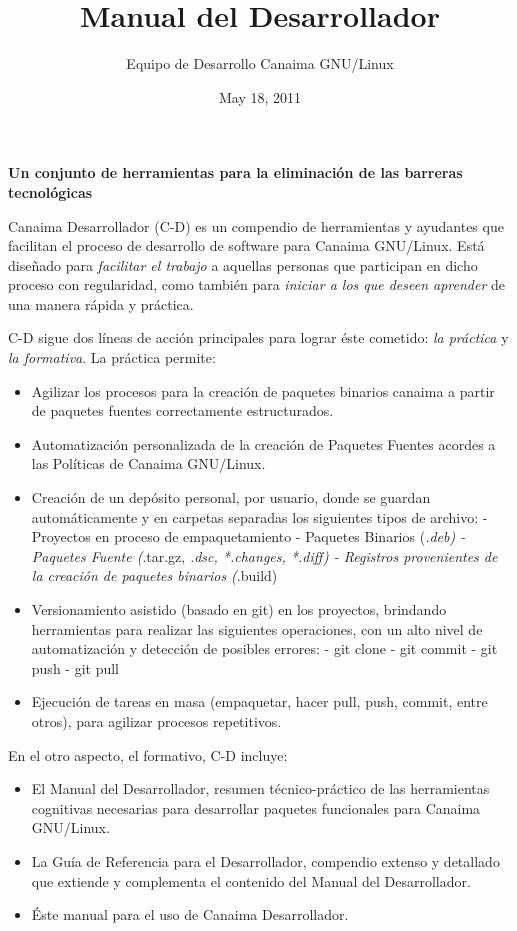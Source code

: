 \documentclass[letterpaper,12pt,spanish]{manual}
\title{Manual del Desarrollador}
\date{May 18, 2011}
\author{Equipo de Desarrollo Canaima GNU/Linux}
\begin{document}
\maketitle
\tableofcontents
\hypertarget{--doc-index}{}


\textbf{Un conjunto de herramientas para la eliminación de las barreras tecnológicas}

Canaima Desarrollador (C-D) es un compendio de herramientas y ayudantes que facilitan el proceso de desarrollo de software para Canaima GNU/Linux. Está diseñado para \emph{facilitar el trabajo} a aquellas personas que participan en dicho proceso con regularidad, como también para \emph{iniciar a los que deseen aprender} de una manera rápida y práctica.

C-D sigue dos líneas de acción principales para lograr éste cometido: \emph{la práctica} y \emph{la formativa}. La práctica permite:
\begin{itemize}
\item {} 
Agilizar los procesos para la creación de paquetes binarios canaima a partir de paquetes fuentes correctamente estructurados.

\item {} 
Automatización personalizada de la creación de Paquetes Fuentes acordes a las Políticas de Canaima GNU/Linux.

\item {} 
Creación de un depósito personal, por usuario, donde se guardan automáticamente y en carpetas separadas los siguientes tipos de archivo:
- Proyectos en proceso de empaquetamiento
- Paquetes Binarios (\emph{.deb)
- Paquetes Fuente (}.tar.gz, \emph{.dsc, *.changes, *.diff)
- Registros provenientes de la creación de paquetes binarios (}.build)

\item {} 
Versionamiento asistido (basado en git) en los proyectos, brindando herramientas para realizar las siguientes operaciones, con un alto nivel de automatización y detección de posibles errores:
- git clone
- git commit
- git push
- git pull

\item {} 
Ejecución de tareas en masa (empaquetar, hacer pull, push, commit, entre otros), para agilizar procesos repetitivos.

\end{itemize}

En el otro aspecto, el formativo, C-D incluye:
\begin{itemize}
\item {} 
El Manual del Desarrollador, resumen técnico-práctico de las herramientas cognitivas necesarias para desarrollar paquetes funcionales para Canaima GNU/Linux.

\item {} 
La Guía de Referencia para el Desarrollador, compendio extenso y detallado que extiende y complementa el contenido del Manual del Desarrollador.

\item {} 
Éste manual para el uso de Canaima Desarrollador.

\end{itemize}
\end{document}
